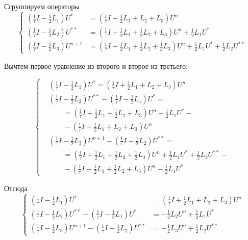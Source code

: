 \documentclass[a4paper,12pt]{article}
\begin{document}
Сгруппируем операторы
\begin{equation*}
  \begin{cases}
    \left( \frac{1}{\tau} I - \frac{1}{2} L_1 \right) U^{*} &=
    \left( \frac{1}{\tau} I + \frac{1}{2} L_1 +  L_2 + L_3 \right) U^n \\
    \left( \frac{1}{\tau} I - \frac{1}{2} L_2 \right) U^{**} &=
    \left( \frac{1}{\tau} I + \frac{1}{2} L_1 + \frac{1}{2} L_2 + L_3 \right) U^n + \frac{1}{2} L_1 U^{*}\\
    \left( \frac{1}{\tau} I - \frac{1}{2} L_3 \right) U^{n+1} &=
    \left( \frac{1}{\tau} I  + \frac{1}{2} L_1 + \frac{1}{2} L_2 + \frac{1}{2} L_3 \right) U^n + \frac{1}{2} L_1 U^{*}   + \frac{1}{2} L_2 U^{**}
  \end{cases}
\end{equation*}

Вычтем первое уравнение из второго и второе из третьего:

\begin{equation*}
  \begin{cases}
    &\left( \frac{1}{\tau} I - \frac{1}{2} L_1 \right) U^{*} =
    \left( \frac{1}{\tau} I + \frac{1}{2} L_1 +  L_2 + L_3 \right) U^n \\
    &\left( \frac{1}{\tau} I - \frac{1}{2} L_2 \right) U^{**} -
    \left( \frac{1}{\tau} I - \frac{1}{2} L_1 \right) U^{*} = \\
    & \qquad = \left( \frac{1}{\tau} I + \frac{1}{2} L_1 + \frac{1}{2} L_2 + L_3 \right) U^n + \frac{1}{2} L_1 U^{*} - \\
    & \qquad - \left( \frac{1}{\tau} I + \frac{1}{2} L_1 +  L_2 + L_3 \right) U^n \\
    &\left( \frac{1}{\tau} I - \frac{1}{2} L_3 \right) U^{n+1} -
    \left( \frac{1}{\tau} I - \frac{1}{2} L_2 \right) U^{**} = \\
    & \qquad = \left( \frac{1}{\tau} I + \frac{1}{2} L_1 + \frac{1}{2} L_2 + \frac{1}{2} L_3 \right) U^n + \frac{1}{2} L_1 U^{*}   + \frac{1}{2} L_2 U^{**} - \\
    & \qquad - \left( \frac{1}{\tau} I + \frac{1}{2} L_1 + \frac{1}{2} L_2 + L_3 \right) U^n - \frac{1}{2} L_1 U^{*}
  \end{cases}
\end{equation*}

Отсюда
\begin{equation*}
  \begin{cases}
    \left( \frac{1}{\tau} I - \frac{1}{2} L_1 \right) U^{*} &=
    \left( \frac{1}{\tau} I + \frac{1}{2} L_1 +  L_2 + L_3 \right) U^n \\
    \left( \frac{1}{\tau} I - \frac{1}{2} L_2 \right) U^{**} -
    \left( \frac{1}{\tau} I - \frac{1}{2} L_1 \right) U^{*} &= - \frac{1}{2} L_2 U^n + \frac{1}{2} L_1 U^{*} \\
    \left( \frac{1}{\tau} I - \frac{1}{2} L_3 \right) U^{n+1} -
    \left( \frac{1}{\tau} I - \frac{1}{2} L_2 \right) U^{**} &= - \frac{1}{2} L_3 U^n + \frac{1}{2} L_2 U^{**}
  \end{cases}
\end{equation*}
\end{document}
